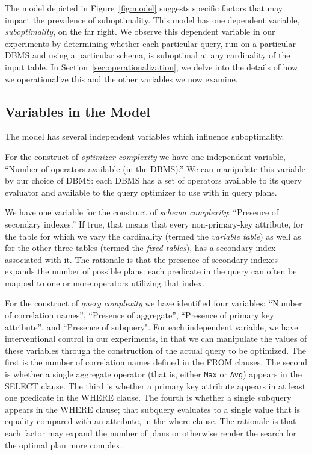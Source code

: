 \documentclass[prodmode,acmtods]{acmsmall}
\begin{document}
The model depicted in Figure~\ref{fig:model} suggests specific factors that may
impact the prevalence of suboptimality. This model has one dependent
variable, {\em suboptimality}, on the far right. We observe this dependent
variable in our experiments by determining whether each particular query,
run on a particular \hbox{DBMS} and using a particular schema,
is suboptimal at any cardinality of the input table. In Section~\ref{sec:operationalization}, we
delve into the details of how we operationalize this and the other variables
we now examine.

\subsection{Variables in the Model}
The model has several independent
variables which influence suboptimality.

For the construct of {\em optimizer
complexity} we have one independent variable, ``\hbox{Number} of operators
available (in the \hbox{DBMS}).'' We can manipulate this variable by our choice of
\hbox{DBMS}: each \hbox{DBMS} has a set of operators available to its query
evaluator and available to the query optimizer to use with in query plans.

We have one variable for the construct of {\em schema complexity}:
``Presence of secondary indexes.'' If true, that means that every
non-primary-key attribute, for the table for which we vary the cardinality
(termed the {\em variable table}) as well as for the other three tables
(termed the {\em fixed
tables}), has a secondary index associated with it. The rationale is that the
presence of secondary indexes expands the number of possible plans: each
predicate in the query can often be mapped to one or more operators
utilizing that index.

For the construct of {\em query complexity} we have identified four
variables: ``Number of correlation names'', ``Presence of aggregate'',
``Presence of primary key attribute'', and ``Presence of subquery". For each independent
variable, we have interventional control in our experiments, in that we can
manipulate the values of these variables through the construction of the
actual query to be optimized. The first is the number of correlation names
defined in the FROM clauses. The second is whether a single aggregate operator
(that is, either {\tt Max} or {\tt Avg}) appears in the SELECT clause.
The third
is whether a primary key attribute appears in at least one predicate in the
WHERE clause. The fourth is whether a single subquery appears in the
WHERE clause; that subquery evaluates to a single value that is
equality-compared with an attribute, in the where clause. The rationale is
that each factor may expand the number of plans or otherwise render the search for
the optimal plan more complex.
\end{document}
